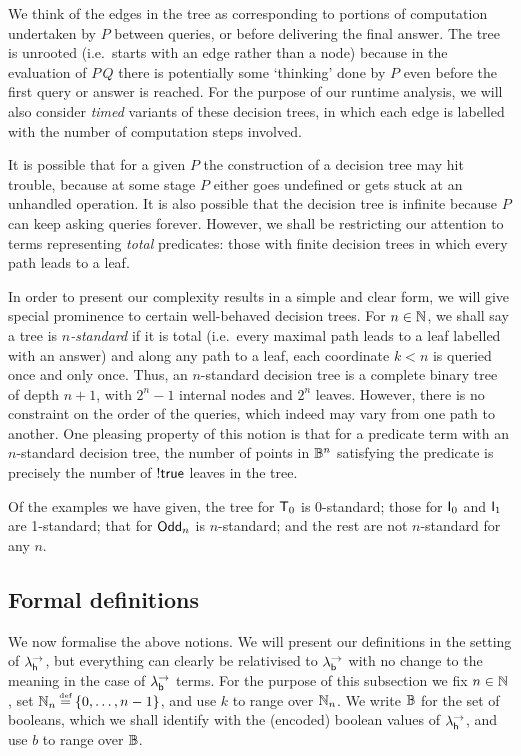 \documentclass[12pt,phd,lfcs,twoside,openright,logo,leftchapter,normalheadings]{infthesis}
\theoremstyle{plain}
\theoremstyle{definition}
\begin{document}
We think of the edges in the tree as corresponding to portions of
computation undertaken by $P$ between queries, or before delivering
the final answer.  The tree is unrooted (i.e.\ starts with an edge
rather than a node) because in the evaluation of $P\,Q$ there is
potentially some `thinking' done by $P$ even before the first query or
answer is reached.  For the purpose of our runtime analysis, we will
also consider \emph{timed} variants of these decision trees, in which
each edge is labelled with the number of computation steps involved.

It is possible that for a given $P$ the construction of a decision
tree may hit trouble, because at some stage $P$ either goes undefined
or gets stuck at an unhandled operation.  It is also possible that the
decision tree is infinite because $P$ can keep asking queries forever.
However, we shall be restricting our attention to terms representing
\emph{total} predicates: those with finite decision trees in which
every path leads to a leaf.

In order to present our complexity results in a simple and clear form,
we will give special prominence to certain well-behaved decision
trees.  For $n \in \mathbb{N}$, we shall say a tree is \emph{$n$-standard} if
it is total (i.e.\ every maximal path leads to a leaf labelled with an
answer) and along any path to a leaf, each coordinate $k<n$ is queried
once and only once. Thus, an $n$-standard decision tree is a complete
binary tree of depth $n+1$, with $2^n - 1$ internal nodes and $2^n$
leaves.  However, there is no constraint on the order of the queries,
which indeed may vary from one path to another.  One pleasing property
of this notion is that for a predicate term with an $n$-standard
decision tree, the number of points in $\mathbb{B}^n$ satisfying the predicate
is precisely the number of $\mathord{!} \mathsf{true}$ leaves in the tree.

Of the examples we have given, the tree for $\mathsf{T}_0$ is 0-standard;
those for $\mathsf{I}_0$ and $\mathsf{I}_1$ are 1-standard; that for
$\mathsf{Odd}_n$ is $n$-standard; and the rest are not $n$-standard for
any $n$.

\subsection{Formal definitions}
\label{sec:predicate-models}
We now formalise the above notions.  We will present our definitions
in the setting of $\lambda^\rightarrow_{\mathsf{h}}$, but everything can clearly be relativised
to $\lambda^\rightarrow_{\mathsf{b}}$ with no change to the meaning in the case of $\lambda^\rightarrow_{\mathsf{b}}$
terms.  For the purpose of this subsection we fix $n \in \mathbb{N}$, set
$\N_n \defas \{0,\ldots,n-1\}$, and use $k$ to range over $\mathbb{N}_n$. We
write $\mathbb{B}$ for the set of booleans, which we shall identify with the
(encoded) boolean values of $\lambda^\rightarrow_{\mathsf{h}}$, and use $b$ to range over $\mathbb{B}$.
\end{document}
